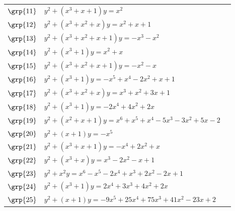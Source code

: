 \begin{longtable}{@{}>{\raggedright\arraybackslash}p{1.35cm}
 >{\raggedright\arraybackslash}p{}
 >{\raggedright\arraybackslash}p{1.1cm}@{}}
$\grp{11}$ & \href{https://www.lmfdb.org/Genus2Curve/Q/353/a/353/1}{$y^2 + (x^{3}+x+1)y = x^{2}$} & \cite{Ogg1973}\\
$\grp{12}$ & \href{https://www.lmfdb.org/Genus2Curve/Q/762/a/3048/1}{$y^2 + (x^{3}+x^{2}+x)y = x^{2}+x+1$} & \cite{BSSVY}\\
$\grp{13}$ & \href{https://www.lmfdb.org/Genus2Curve/Q/349/a/349/1}{$y^2 + (x^{3}+x^{2}+x+1)y = -x^{3}-x^{2}$} & \cite{Flynn1990,Leprevost1991a}\\
$\grp{14}$ & \href{https://www.lmfdb.org/Genus2Curve/Q/249/a/249/1}{$y^2 + (x^{3}+1)y = x^{2}+x$} & \cite{PP2012,PZP2013}\\
$\grp{15}$ & \href{https://www.lmfdb.org/Genus2Curve/Q/277/a/277/1}{$y^2 + (x^{3}+x^{2}+x+1)y = -x^{2}-x$} & \cite{Leprevost1991}\\
$\grp{16}$ & \href{https://www.lmfdb.org/Genus2Curve/Q/830/a/6640/1}{$y^2 + (x^{3}+1)y = -x^{5}+x^{4}-2x^{2}+x+1$} & \cite{BSSVY}\\
$\grp{17}$ & \href{https://www.lmfdb.org/Genus2Curve/Q/1996/b/510976/1}{$y^2 + (x^{3}+x^{2}+x)y = x^{3}+x^{2}+3x+1$} & \cite{Leprevost1991}\\
$\grp{18}$ & \href{https://www.lmfdb.org/Genus2Curve/Q/1180/a/18880/1}{$y^2 + (x^{3}+1)y = -2x^{4}+4x^{2}+2x$} & \cite{PP2012,PZP2013}\\
$\grp{19}$ & \href{https://alpha.lmfdb.org/Genus2Curve/Q/?jump=[[-2,5,-3,-5,1,1,1],[1,1,1]]}{$y^2 + (x^{2}+x+1)y = x^{6}+x^{5}+x^{4}-5x^{3}-3x^{2}+5x-2$} & \cite{Leprevost1991,PZP2013}\\
$\grp{20}$ & \href{https://www.lmfdb.org/Genus2Curve/Q/394/a/3152/1}{$y^2 + (x+1)y = -x^{5}$} & \cite{Leprevost1997}\\
$\grp{21}$ & \href{https://www.lmfdb.org/Genus2Curve/Q/388/a/776/1}{$y^2 + (x^{3}+x+1)y = -x^{4}+2x^{2}+x$} & \cite{Leprevost1991}\\
$\grp{22}$ & \href{https://www.lmfdb.org/Genus2Curve/Q/1192/a/19072/1}{$y^2 + (x^{3}+x)y = x^{3}-2x^{2}-x+1$} & \cite{Leprevost1993}\\
$\grp{23}$ & \href{https://alpha.lmfdb.org/Genus2Curve/Q/?jump=[[1,-2,2,1,-2,-1,1],[0,0,1]]}{$y^2 + x^{2}y = x^{6}-x^{5}-2x^{4}+x^{3}+2x^{2}-2x+1$} & \cite{Leprevost1993}\\
$\grp{24}$ & \href{https://www.lmfdb.org/Genus2Curve/Q/1908/a/183168/1}{$y^2 + (x^{3}+1)y = 2x^{4}+3x^{3}+4x^{2}+2x$} & \cite{Leprevost1993}\\
$\grp{25}$ & \href{https://alpha.lmfdb.org/Genus2Curve/Q/?jump=[[2,-23,41,75,25,-9],[1,1]]}{$y^2 + (x+1)y = -9x^{5}+25x^{4}+75x^{3}+41x^{2}-23x+2$} & \cite{Nicholls2018}\\

\end{longtable}
